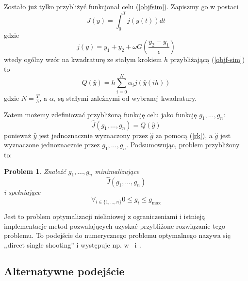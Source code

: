\documentclass[11pt]{article}
\newtheorem{problem}{Problem}
\begin{document}
Zostało już tylko przybliżyć funkcjonał celu (\ref{objfsim}). Zapiszmy go w postaci
\begin{equation} \label{objf-sim}
  J(y) = \int_0^T j(y(t)) dt
\end{equation}
gdzie
\begin{equation}
  j(y) = y_1 + y_2 + \omega G\left(\frac{y_2 - y_1}{\epsilon} \right)
\end{equation}
wtedy ogólny wzór na kwadraturę ze stałym krokiem $h$ przybliżającą (\ref{objf-sim}) to
\begin{equation} \label{quad}
  Q(\hat{y}) = h\sum_{i = 0}^N \alpha_i j(\hat{y}(ih))
\end{equation}
gdzie $N = \frac{T}{h}$, a $\alpha_i$ są stałymi zależnymi od wybranej kwadratury.

Zatem możemy zdefiniować przybliżoną funkcję celu jako funkcję $g_1,\ldots,g_n$:
\begin{equation}
  \hat{J}(g_1,\ldots, g_n) = Q(\hat{y})
\end{equation}
ponieważ $\hat{y}$ jest jednoznacznie wyznaczony przez $\hat{g}$ za pomocą (\ref{rk}), a $\hat{g}$ jest wyznaczone jednoznacznie przez $g_1,\ldots,g_n$. Podsumowując, problem przybliżony to:
\begin{problem}\label{problemapprox}
  Znaleźć $g_1,\ldots, g_n$ minimalizujące
\begin{equation}\label{nlp}
  \hat{J}(g_1,\ldots, g_n)
\end{equation}
i spełniające
\begin{equation}\label{nlp_cons}
  \forall_{i \in \{1,\ldots,n\}} 0 \le g_i \le g_{\max}
\end{equation}
\end{problem}

Jest to problem optymalizacji nieliniowej z ograniczeniami i istnieją implementacje metod pozwalających uzyskać przybliżone rozwiązanie tego problemu. To podejście do numerycznego problemu optymalnego nazywa się ,,direct single shooting'' i występuje np. w~\cite{diehl} i~\cite{rao-methods}.

\subsection{Alternatywne podejście}
\end{document}
